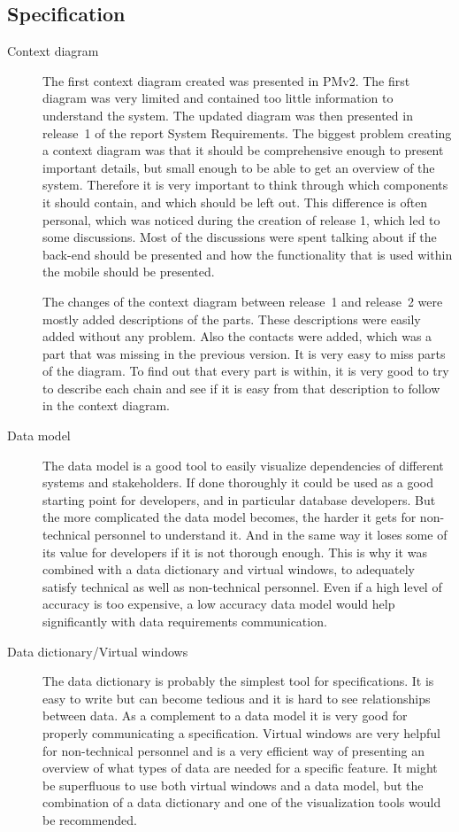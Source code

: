 \documentclass[10pt,a4paper]{article}
\begin{document}
\subsection{Specification}
\begin{description}
\item[Context diagram] The first context diagram created was presented in PMv2. The first diagram was very limited and contained too little information to understand the system. The updated diagram was then presented in release~1 of the report System Requirements. The biggest problem creating a context diagram was that it should be comprehensive enough to present important details, but small enough to be able to get an overview of the system. Therefore it is very important to think through which components it should contain, and which should be left out. This difference is often personal, which was noticed during the creation of release 1, which led to some discussions. Most of the discussions were spent talking about if the back-end should be presented and how the functionality that is used within the mobile should be presented. 

The changes of the context diagram between release~1 and release~2 were mostly added descriptions of the parts. These descriptions were easily added without any problem. Also the contacts were added, which was a part that was missing in the previous version. It is very easy to miss parts of the diagram. To find out that every part is within, it is very good to try to describe each chain and see if it is easy from that description to follow in the context diagram. 

\item[Data model] The data model is a good tool to easily visualize dependencies of different systems and stakeholders. If done  thoroughly it could be used as a good starting point for developers, and in particular database developers. But the more complicated the data model becomes, the harder it gets for non-technical personnel to understand it. And in the same way it loses some of its value for developers if it is not thorough enough. This is why it was combined with  a data dictionary and virtual windows, to adequately satisfy technical as well as non-technical personnel. Even if a high level of accuracy is too expensive, a low accuracy data model would help significantly with data requirements communication.

\item[Data dictionary/Virtual windows] The data dictionary is probably the simplest tool for specifications. It is easy to write but can become tedious and it is hard to see relationships between data. As a complement to a data model it is very good for properly communicating a specification. Virtual windows are very helpful for non-technical personnel and is a very efficient way of presenting an overview of what types of data are needed for a specific feature. It might be superfluous to use both virtual windows and a data model, but the combination of a data dictionary and one of the visualization tools would be recommended. 


\end{description}
\end{document}
